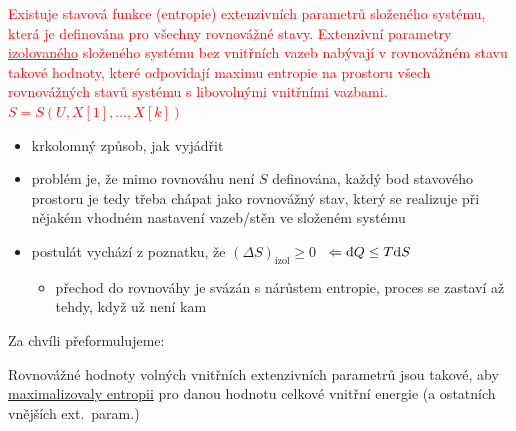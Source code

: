 \begin{veta}[Postulát 2]
\textcolor{Red}{Existuje stavová funkce (entropie) extenzivních parametrů složeného systému, která je definována pro všechny rovnovážné stavy. Extenzivní parametry \underline{izolovaného} složeného systému bez vnitřních vazeb nabývají v rovnovážném stavu takové hodnoty, které odpovídají maximu entropie na prostoru všech rovnovážných stavů systému s libovolnými vnitřními vazbami. $S = S(U, X[1],\dots,X[k])$}
\end{veta}
\begin{itemize}
  \item[$\to$] krkolomný způsob, jak vyjádřit 
  \item[$\to$] problém je, že mimo rovnováhu není $S$ definována, každý bod stavového prostoru je tedy třeba chápat jako rovnovážný stav, který se realizuje při nějakém vhodném nastavení vazeb/stěn ve složeném systému
  \item[$\to$] postulát vychází z poznatku, že $(\Delta S)_{\text{izol}}\geq 0$ \ \textcolor{NavyBlue}{$\Leftarrow \dbar Q\leq T\dd S$}
  \begin{itemize}
    \item[--] přechod do rovnováhy je svázán s nárůstem entropie, proces se zastaví až tehdy, když už není kam
  \end{itemize}
\end{itemize}

\noindent
\begin{minipage}{0.16\textwidth}\color{NavyBlue}\small Za chvíli přeformulujeme:\end{minipage}
\begin{minipage}{0.82\textwidth}
\begin{tcolorbox}[colback=NavyBlue!4,colframe=NavyBlue,boxrule=0.6pt,arc=1pt,left=4pt,right=4pt,top=2pt,bottom=2pt]
\color{NavyBlue}Rovnovážné hodnoty volných vnitřních extenzivních parametrů jsou takové, aby \underline{maximalizovaly entropii} pro danou hodnotu celkové vnitřní energie {\small (a ostatních vnějších ext.\ param.)}
\end{tcolorbox}
\end{minipage}

